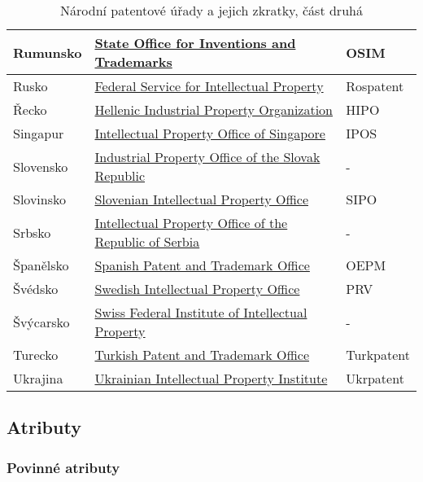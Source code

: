 \begin{table}[h!]
\begin{tabular}{|>{\centering\arraybackslash}p{2.2cm}|>{\centering\arraybackslash}p{8cm}|>{\centering\arraybackslash}p{2cm}|}
	\hline
	Rumunsko & \href{http://www.osim.ro/}{State Office for Inventions and Trademarks}  & OSIM         \\ 
	\hline
	Rusko & \href{https://rospatent.gov.ru/}{Federal Service for Intellectual Property}  & Rospatent         \\ 
	\hline
	Řecko & \href{http://www.obi.gr/el/}{Hellenic Industrial Property Organization}  & HIPO         \\ 
	\hline
	Singapur & \href{http://www.ipos.gov.sg/}{Intellectual Property Office of Singapore}  & IPOS         \\ 
	\hline
	Slovensko & \href{https://www.indprop.gov.sk/}{Industrial Property Office of the Slovak Republic}  & -         \\ 
	\hline
	Slovinsko & \href{http://www.uil-sipo.si/}{Slovenian Intellectual Property Office}  & SIPO         \\ 
	\hline
	Srbsko & \href{http://www.zis.gov.rs/}{Intellectual Property Office of the Republic of Serbia}  & -         \\ 
	\hline
	Španělsko & \href{http://www.oepm.es/}{Spanish Patent and Trademark Office}  & OEPM         \\ 
	\hline
	Švédsko & \href{http://www.prv.se/}{Swedish Intellectual Property Office}  & PRV         \\ 
	\hline
	Švýcarsko & \href{https://www.ige.ch/}{Swiss Federal Institute of Intellectual Property}  & -         \\ 
	\hline
	Turecko & \href{http://www.turkpatent.gov.tr/}{Turkish Patent and Trademark Office}  & Turkpatent         \\ 
	\hline
	Ukrajina & \href{https://ukrpatent.org/en}{Ukrainian Intellectual Property Institute}  & Ukrpatent         \\ 
	\hline
	\end{tabular}
	\caption{Národní patentové úřady a jejich zkratky, část druhá}
	\label{tab:table_offices2}
	\end{table}

\newpage

\subsection{Atributy}
\subsubsection{Povinné atributy}

